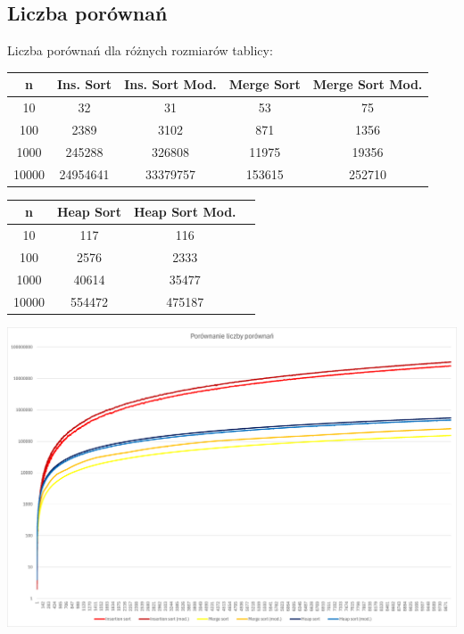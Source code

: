 \documentclass{article}
\begin{document}
\subsection{Liczba porównań}

Liczba porównań dla różnych rozmiarów tablicy:

\begin{center}
\begin{tabular}{|c|c|c|c|c|}
 \hline
 n & Ins. Sort & Ins. Sort Mod. & Merge Sort & Merge Sort Mod. \\ 
 \hline
 10 & 32 & 31 & 53 & 75 \\
 100 & 2389 & 3102 & 871 & 1356 \\
 1000 & 245288 & 326808 & 11975 & 19356 \\
 10000 & 24954641 & 33379757 & 153615 & 252710 \\
 \hline
\end{tabular}

\vspace{0.5cm}

\begin{tabular}{|c|c|c|c|}
 \hline
 n & Heap Sort & Heap Sort Mod. \\ 
 \hline
 10 & 117 & 116 \\
 100 & 2576 & 2333 \\
 1000 & 40614 & 35477 \\
 10000 & 554472 & 475187 \\
 \hline
\end{tabular}
\end{center}

\begin{center}
    \includegraphics[width=1\textwidth]{Wykres2.png}
\end{center}
\end{document}
